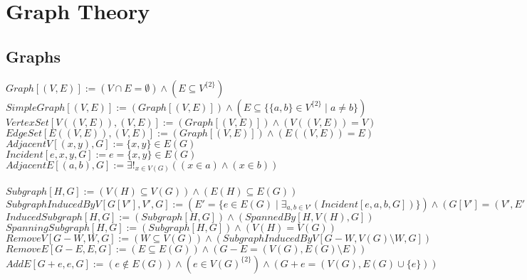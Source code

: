 \documentclass{book}
\newcommand{\abr}{:=}
\newcommand{\pr}[1]{\left(#1\right)}
\newcommand{\setbackgroundcolour}{\pagecolor[rgb]{0.2,0.2,0.2}}
\newcommand{\settextcolour}{\color[rgb]{0.8,0.8,0.8}}
\newcommand{\invertbackgroundtext}{\setbackgroundcolour\settextcolour}
\newcommand{\st}{\mathbin{|}}
\newcommand{\utup}[1]{\{#1\}}
\newcommand{\notation}[2]{\fbox{{[Notation] \phantom{-} $#1 \abr #2$}}}
\begin{document}
\invertbackgroundtext
\setlength{\parindent}{0pt}

\tableofcontents

\chapter{Graph Theory}

\section{Graphs}
$Graph[(V, E)] \abr (V \cap E = \emptyset) \land (E \subseteq V^{\{2\}})$ \\
$SimpleGraph[(V, E)] \abr \pr{Graph[(V, E)]} \land (E \subseteq \{\utup{a, b} \in V^{\{2\}} \st a \neq b\})$ \\
$VertexSet[V\pr{(V, E)}, (V, E)] \abr \pr{Graph[(V, E)]} \land \pr{V\pr{(V, E)} = V}$ \\
$EdgeSet[E\pr{(V, E)}, (V, E)] \abr \pr{Graph[(V, E)]} \land \pr{E\pr{(V, E)} = E}$ \\
$AdjacentV[(x, y), G] \abr \utup{x, y} \in E(G)$ \\
$Incident[e, x, y, G] \abr e = \utup{x, y} \in E(G)$ \\
$AdjacentE[(a, b), G] \abr \exists!_{x \in V(G)}\pr{(x \in a) \land (x \in b)}$ \\
\notation{x ~ y}{AdjacentV[(x, y), G]} \\

$Subgraph[H, G] \abr \pr{V(H) \subseteq V(G)} \land \pr{E(H) \subseteq E(G)}$ \\
$SubgraphInducedByV[G[V'], V', G] \abr \pr{E' = \{e \in E(G) \st \exists_{a, b \in V'}(Incident[e, a, b, G])\}} \land \pr{G[V'] = (V', E')}$ \\
$InducedSubgraph[H, G] \abr (Subgraph[H, G]) \land \pr{SpannedBy[H, V(H), G]}$ \\
$SpanningSubgraph[H, G] \abr (Subgraph[H, G]) \land \pr{V(H) = V(G)}$ \\

$RemoveV[G - W, W, G] \abr \pr{W \subseteq V(G)} \land \pr{SubgraphInducedByV[G - W, V(G) \setminus W, G]}$ \\
$RemoveE[G - E, E, G] \abr \pr{E \subseteq E(G)} \land \pr{G - E = \pr{V(G), E(G) \setminus E}}$ \\
$AddE[G + e, e, G] \abr \pr{e \notin E(G)} \land \pr{e \in V(G)^{\{2\}}} \land \pr{G + e = \pr{V(G), E(G) \cup \{e\}}}$ \\
\end{document}
